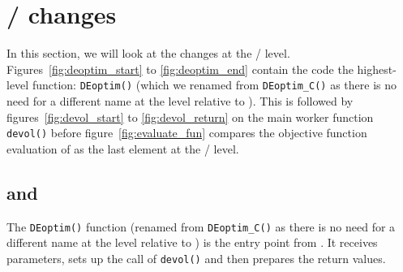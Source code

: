 \documentclass[nojss,shortnames,article]{jss}
\begin{document}
\section[C / C++ changes]{ /  changes}
\label{sec:Cppchanges}

In this section, we will look at the changes at the  /
 level. Figures~\ref{fig:deoptim_start} to
\ref{fig:deoptim_end} contain the code the highest-level 
function: \verb|DEoptim()| (which we renamed from \verb|DEoptim_C()| as there
is no need for a different name at the  level relative to
). This is followed by figures~\ref{fig:devol_start} to
\ref{fig:devol_return} on the main worker function \verb|devol()| before
figure~\ref{fig:evaluate_fun} compares the objective function evaluation of
as the last element at the  /  level.

\subsection[de4_0.c and deoptim.cpp]{ and }

The \verb|DEoptim()| function (renamed from \verb|DEoptim_C()| as there is no need for a different
name at the  level relative to ) is the entry point
from . It receives parameters, sets up the call of \verb|devol()|
and then prepares the return values. 
\end{document}

